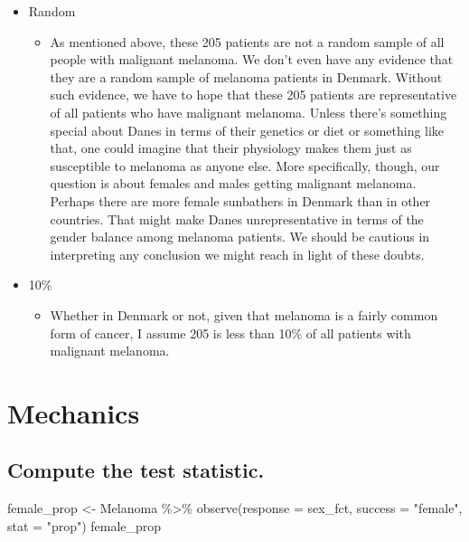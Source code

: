 \documentclass[
]{book}
\newenvironment{Shaded}{\begin{snugshade}}{\end{snugshade}}
\newcommand{\AttributeTok}[1]{\textcolor[rgb]{0.77,0.63,0.00}{#1}}
\newcommand{\FunctionTok}[1]{\textcolor[rgb]{0.00,0.00,0.00}{#1}}
\newcommand{\NormalTok}[1]{#1}
\newcommand{\OtherTok}[1]{\textcolor[rgb]{0.56,0.35,0.01}{#1}}
\newcommand{\SpecialCharTok}[1]{\textcolor[rgb]{0.00,0.00,0.00}{#1}}
\newcommand{\StringTok}[1]{\textcolor[rgb]{0.31,0.60,0.02}{#1}}
\providecommand{\tightlist}{%
  \setlength{\itemsep}{0pt}\setlength{\parskip}{0pt}}
\begin{document}
\begin{itemize}
\tightlist
\item
  Random

  \begin{itemize}
  \tightlist
  \item
    As mentioned above, these 205 patients are not a random sample of all people with malignant melanoma. We don't even have any evidence that they are a random sample of melanoma patients in Denmark. Without such evidence, we have to hope that these 205 patients are representative of all patients who have malignant melanoma. Unless there's something special about Danes in terms of their genetics or diet or something like that, one could imagine that their physiology makes them just as susceptible to melanoma as anyone else. More specifically, though, our question is about females and males getting malignant melanoma. Perhaps there are more female sunbathers in Denmark than in other countries. That might make Danes unrepresentative in terms of the gender balance among melanoma patients. We should be cautious in interpreting any conclusion we might reach in light of these doubts.
  \end{itemize}
\item
  10\%

  \begin{itemize}
  \tightlist
  \item
    Whether in Denmark or not, given that melanoma is a fairly common form of cancer, I assume 205 is less than 10\% of all patients with malignant melanoma.
  \end{itemize}
\end{itemize}

\hypertarget{hypothesis2-ex-mechanics}{%
\section{Mechanics}\label{hypothesis2-ex-mechanics}}

\hypertarget{hypothesis2-ex-compute-test-stat}{%
\subsection{Compute the test statistic.}\label{hypothesis2-ex-compute-test-stat}}

\begin{Shaded}
\begin{Highlighting}[]
\NormalTok{female\_prop }\OtherTok{\textless{}{-}}\NormalTok{ Melanoma }\SpecialCharTok{\%\textgreater{}\%}
    \FunctionTok{observe}\NormalTok{(}\AttributeTok{response =}\NormalTok{ sex\_fct, }\AttributeTok{success =} \StringTok{"female"}\NormalTok{,}
            \AttributeTok{stat =} \StringTok{"prop"}\NormalTok{)}
\NormalTok{female\_prop}
\end{Highlighting}
\end{Shaded}
\end{document}
